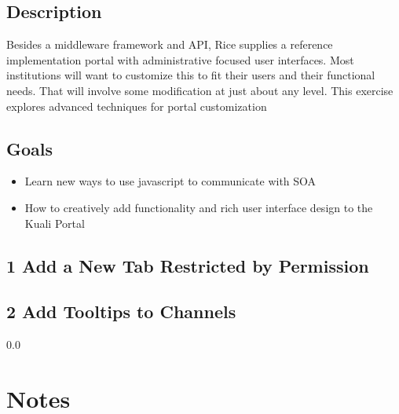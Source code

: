 \subsection*{Description}
Besides a middleware framework and API, Rice supplies a reference
implementation portal with administrative focused user
interfaces. Most institutions will want to customize this to fit their
users and their functional needs. That will involve some modification
at just about any level. This exercise explores advanced techniques
for portal customization

\subsection*{Goals}
\begin{itemize}
  \item Learn new ways to use javascript to communicate with SOA 
  \item How to creatively add functionality and rich user interface
    design to the Kuali Portal
\end{itemize}

\subsection*{1 Add a New Tab Restricted by Permission}

\subsection*{2 Add Tooltips to Channels}

\newpage
  {\setlength{\baselineskip}%
           {0.0\baselineskip}
  \section*{Notes}
  \hrulefill \par}

